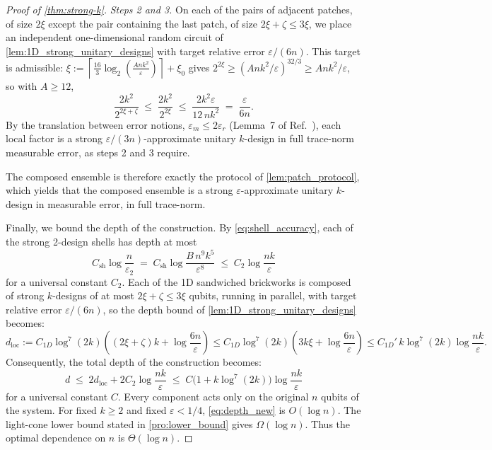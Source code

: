 \documentclass[
    aps,
    superscriptaddress,
    onecolumn,
    10pt,
    prx,
    nofootinbib
]{revtex4-2}
\theoremstyle{namedstatement}
\theoremstyle{plain}
\begin{document}
\begin{proof}[Proof of \cref{thm:strong-k}]
\emph{Steps 2 and 3.} On each of the pairs of adjacent patches, of size $2\xi$ except the pair containing the last patch, of size $2\xi+\zeta\leq 3\xi$, we place an independent one-dimensional random circuit of
\cref{lem:1D_strong_unitary_designs} with target relative error $\varepsilon/(6n)$.
This target is admissible:
$\xi := \left\lceil \frac{16}{3}\log_2\left(\frac{Ank^2}{\varepsilon}\right)\right\rceil+\xi_0$
gives $2^{2\xi}\geq (Ank^{2}/\varepsilon)^{32/3}\geq Ank^{2}/\varepsilon$, so with
$A\geq 12$,
\begin{equation}
 \frac{2k^{2}}{2^{2\xi+\zeta}} \;\leq\;
    \frac{2k^{2}}{2^{2\xi}} \;\leq\; \frac{2k^{2}\varepsilon}{12\,nk^{2}} \;=\;
    \frac{\varepsilon}{6n}.
    \label{eq:local_admissible}
\end{equation}
By the translation between error notions, $\varepsilon_{m}\leq 2\varepsilon_{r}$
(Lemma~7 of Ref.~\cite{SchusterEtAlStrong2025}), each local factor is a strong
$\varepsilon/(3n)$-approximate unitary $k$-design in full trace-norm measurable error,
as steps 2 and 3 require.

The composed ensemble is therefore exactly the protocol of \cref{lem:patch_protocol},
which yields that the composed ensemble is a strong $\varepsilon$-approximate unitary
$k$-design in measurable error, in full trace-norm.

Finally, we bound the depth of the construction. By \cref{eq:shell_accuracy}, each of
the strong 2-design shells has depth at most
\begin{equation}
    C_{\mathrm{sh}}\log\frac{n}{\varepsilon_2}
    \;=\; C_{\mathrm{sh}}\log\frac{B\,n^{9}k^{5}}{\varepsilon^{8}}
    \;\leq\; C_{2}\log\frac{nk}{\varepsilon}
    \label{eq:shell_depth}
\end{equation}
for a universal constant $C_{2}$. Each of the 1D sandwiched brickworks is composed of
strong $k$-designs of at most $2\xi+\zeta\leq 3\xi$ qubits, running in parallel, with target
relative error $\varepsilon/(6n)$, so the depth bound of
\cref{lem:1D_strong_unitary_designs} becomes:
\begin{equation}
    d_{\mathrm{loc}} := C_{1D}\log^{7}(2k)\left((2\xi+\zeta)k+\log\frac{6n}{\varepsilon}\right)
    \leq C_{1D}\log^{7}(2k)\left(3k\xi+\log\frac{6n}{\varepsilon}\right)
    \leq C_{1D}'\,k\log^{7}(2k)\log\frac{nk}{\varepsilon}.
    \label{eq:dloc_new}
\end{equation}
Consequently, the total depth of the construction becomes:
\begin{equation}
    d \;\leq\; 2d_{\mathrm{loc}}+2C_{2}\log\frac{nk}{\varepsilon}
    \;\leq\; C\bigl(1+k\log^{7}(2k)\bigr)\log\frac{nk}{\varepsilon}
    \label{eq:depth_new}
\end{equation}
for a universal constant $C$. Every component acts only on the original $n$ qubits of
the system. For fixed $k\geq 2$ and fixed $\varepsilon < 1/4$, \cref{eq:depth_new} is
$O(\log n)$. The light-cone lower bound stated in \cref{pro:lower_bound} gives
$\Omega(\log n)$. Thus the optimal dependence on $n$ is $\Theta(\log n)$.


\end{proof}
\end{document}
